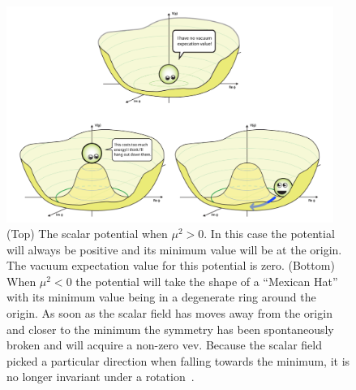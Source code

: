 \begin{figure}[hbt]
	\begin{center}
		\includegraphics[width=0.95\textwidth]{figures/Chapter2/HiggsVEV.png}
		\caption{(Top) The scalar potential when $\mu^{2}>0$. In this case the potential will always be positive and its minimum value will be at the origin. The vacuum expectation value for this potential is zero. (Bottom) When $\mu^{2}<0$ the potential will take the shape of a ``Mexican Hat'' with its minimum value being in a degenerate ring around the origin. As soon as the scalar field has moves away from the origin and closer to the minimum the symmetry has been spontaneously broken and will acquire a non-zero vev. Because the scalar field picked a particular direction when falling towards the minimum, it is no longer invariant under a rotation~\cite{Tanedo}.}
		\label{fig:higgs_vev}
	\end{center}
\end{figure}

